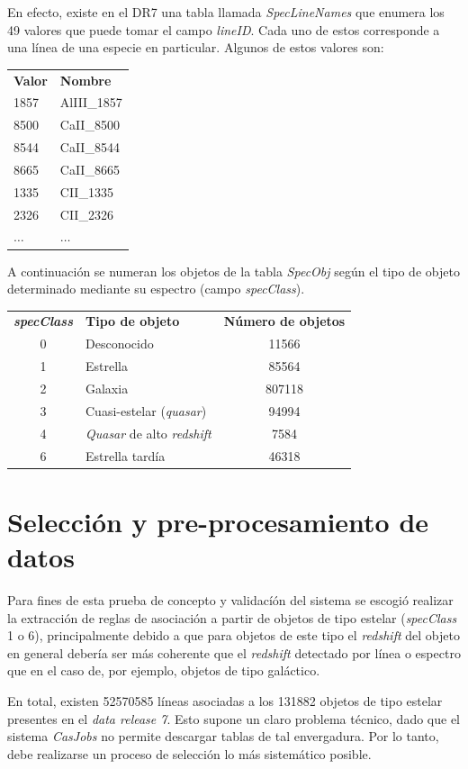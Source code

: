 En efecto, existe en el DR7 una tabla llamada \textit{SpecLineNames} que enumera los 49 valores que puede tomar el campo \textit{lineID}. Cada uno de estos corresponde a una línea de una especie en particular. Algunos de estos valores son:

\begin{tabular}{l l}
\textbf{Valor} & \textbf{Nombre} \\
1857 & AlIII\_1857 \\
8500 & CaII\_8500 \\
8544 & CaII\_8544 \\
8665 & CaII\_8665 \\
1335 & CII\_1335 \\
2326 & CII\_2326 \\
$\ldots$ & $\ldots$ \\
\end{tabular}

A continuación se numeran los objetos de la tabla \textit{SpecObj} según el tipo de objeto determinado mediante su espectro (campo \textit{specClass}).

\begin{tabular}{c l c}
\textbf{\textit{specClass}} & \textbf{Tipo de objeto} & \textbf{Número de objetos}\\
0 & Desconocido & 11566 \\
1 & Estrella & 85564 \\
2 & Galaxia & 807118 \\
3 & Cuasi-estelar (\textit{quasar}) & 94994 \\
4 & \textit{Quasar} de alto \textit{redshift} & 7584 \\
6 & Estrella tardía & 46318 \\
\end{tabular}

\section{Selección y pre-procesamiento de datos}

Para fines de esta prueba de concepto y validacíón del sistema se escogió realizar la extracción de reglas de asociación a partir de objetos de tipo estelar (\textit{specClass} 1 o 6), principalmente debido a que para objetos de este tipo el \textit{redshift} del objeto en general debería ser más coherente que el \textit{redshift} detectado por línea o espectro que en el caso de, por ejemplo, objetos de tipo galáctico.

En total, existen 52570585 líneas asociadas a los 131882 objetos de tipo estelar presentes en el \textit{data release 7}. Esto supone un claro problema técnico, dado que el sistema \textit{CasJobs} no permite descargar tablas de tal envergadura. Por lo tanto, debe realizarse un proceso de selección lo más sistemático posible. 

